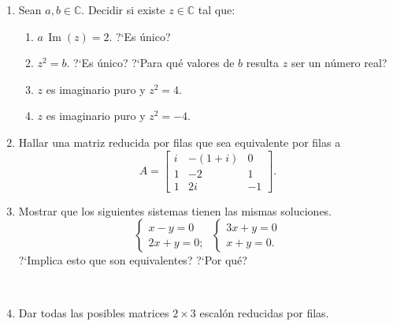 \documentclass[11pt,spanish,makeidx]{amsbook}
\renewcommand\Im{\operatorname{Im}}
\begin{document}
\begin{enumerate}


\item Sean $a,b\in\mathbb{C}$. Decidir si existe $z \in \mathbb{C}$ tal que:
\begin{enumerate}
  \item $a \, \Im(z)=2$.  ?`Es \'unico?
  \item $z^2=b$. ?`Es \'unico? ?`Para qu\'e valores de $b$ resulta $z$ ser un n\'umero real?
  \item $z$ es imaginario puro y $z^2=4$.
  \item $z$ es imaginario puro y $z^2=-4$.
\end{enumerate}

\item Hallar una matriz reducida por filas que sea equivalente por filas a
$$A= \begin{bmatrix}i & -(1+i) & 0 \\1 & -2 & 1 \\1&2i&-1 \end{bmatrix}.$$

\vspace{.5cm}

\item Mostrar que los siguientes sistemas tienen las mismas soluciones.
\[\begin{cases} x-y=0 \\ 2x+y=0; \end{cases} \;
     \begin{cases} 3x+y=0 \\ x+y=0. \end{cases}   \]
?`Implica esto que son equivalentes? ?`Por qu\'e?

\

\item
Dar todas las posibles matrices $2\times3$ escal\'on reducidas por filas.



\



\end{enumerate}
\end{document}
